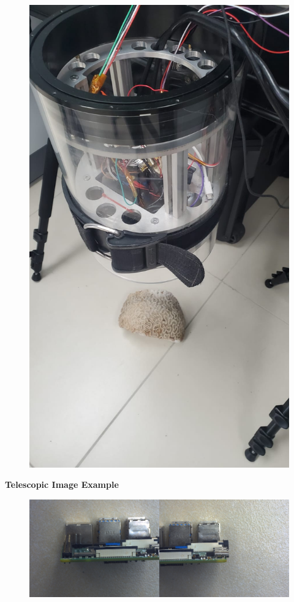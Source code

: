 \documentclass[17pt, aspectratio=169]{beamer}
\begin{document}
\begin{frame}
\begin{figure}
		\includegraphics[width=\textwidth, height=\textheight, keepaspectratio]{./Figures/MOSIS2.png}
	\end{figure}
\end{frame}
\begin{frame}
	\textbf{Telescopic Image Example}
	\begin{figure}
		\includegraphics[width=\textwidth, height=\textheight, keepaspectratio]{./Figures/focusStack-S.jpg}
	\end{figure}
\end{frame}
\end{document}
